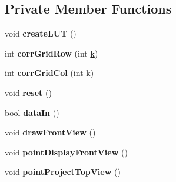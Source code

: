 \subsection*{Private Member Functions}
\begin{DoxyCompactItemize}
\item 
\hypertarget{class_radar_controller_a33369997a716834141f2706d5b88d0be}{}void {\bfseries create\+L\+U\+T} ()\label{class_radar_controller_a33369997a716834141f2706d5b88d0be}

\item 
\hypertarget{class_radar_controller_a99bcb7535e79bd1152a46013bd37a82a}{}int {\bfseries corr\+Grid\+Row} (int \hyperlink{class_top_view_a1f2b530e7979db621630dbbf9f5def15}{k})\label{class_radar_controller_a99bcb7535e79bd1152a46013bd37a82a}

\item 
\hypertarget{class_radar_controller_aaa845fcc3797bf9c4d0668236388decb}{}int {\bfseries corr\+Grid\+Col} (int \hyperlink{class_top_view_a1f2b530e7979db621630dbbf9f5def15}{k})\label{class_radar_controller_aaa845fcc3797bf9c4d0668236388decb}

\item 
\hypertarget{class_radar_controller_ad93fa3a9ec75d9f3bb9f4ad0a75ae006}{}void {\bfseries reset} ()\label{class_radar_controller_ad93fa3a9ec75d9f3bb9f4ad0a75ae006}

\item 
\hypertarget{class_radar_controller_af7eaac873ac1f4fc746c0d9cd31d248c}{}bool {\bfseries data\+In} ()\label{class_radar_controller_af7eaac873ac1f4fc746c0d9cd31d248c}

\item 
\hypertarget{class_radar_controller_a0d6d498d176e09a3ab6078950ff6e275}{}void {\bfseries draw\+Front\+View} ()\label{class_radar_controller_a0d6d498d176e09a3ab6078950ff6e275}

\item 
\hypertarget{class_radar_controller_aad4969066e1eab064e99d3bbcb8d2497}{}void {\bfseries point\+Display\+Front\+View} ()\label{class_radar_controller_aad4969066e1eab064e99d3bbcb8d2497}

\item 
\hypertarget{class_radar_controller_aed3a2fd37be354f86dc0be65957a662a}{}void {\bfseries point\+Project\+Top\+View} ()\label{class_radar_controller_aed3a2fd37be354f86dc0be65957a662a}

\end{DoxyCompactItemize}
